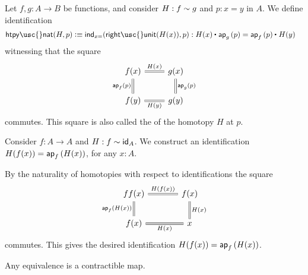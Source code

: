 \begin{defn}\label{defn:htpy_nat}
Let $f,g:A\to B$ be functions, and consider $H:f\htpy g$ and $p:x=y$ in $A$. We define identification
\begin{align*}
\mathsf{htpy\usc{}nat}(H,p) \defeq \ind{x=}(\mathsf{right\usc{}unit}(H(x)),p) & :\ct{H(x)}{\ap{g}{p}}=\ct{\ap{f}{p}}{H(y)}
\end{align*}
witnessing that the square
\begin{equation*}
\begin{tikzcd}
f(x) \arrow[r,equals,"H(x)"] \arrow[d,equals,swap,"\ap{f}{p}"] & g(x) \arrow[d,equals,"\ap{g}{p}"] \\
f(y) \arrow[r,equals,swap,"H(y)"] & g(y)
\end{tikzcd}
\end{equation*}
commutes. This square is also called the  of the homotopy $H$ at $p$.
\end{defn}

\begin{defn}\label{defn:retraction_swap}
Consider $f:A\to A$ and $H: f\htpy \idfunc[A]$. We construct an identification $H(f(x))=\ap{f}{H(x)}$, for any $x:A$.
\end{defn}

\begin{constr}
By the naturality of homotopies with respect to identifications the square
\begin{equation*}
\begin{tikzcd}[column sep=large]
ff(x) \arrow[d,swap,equals,"\ap{f}{H(x)}"] \arrow[r,equals,"H(f(x))"] & f(x) \arrow[d,equals,"H(x)"] \\
f(x) \arrow[r,swap,equals,"H(x)"] & x
\end{tikzcd}
\end{equation*}
commutes. This gives the desired identification $H(f(x))=\ap{f}{H(x)}$.
\end{constr}

\begin{thm}\label{thm:contr_equiv}
Any equivalence is a contractible map.
\end{thm}

